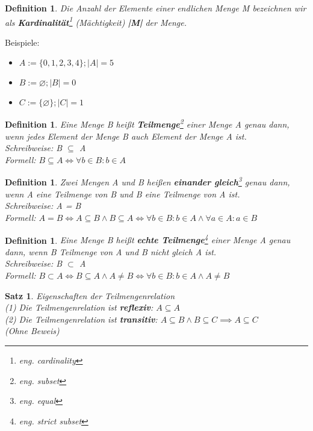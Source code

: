 \documentclass[12pt,german,a4]{article}
\begin{document}
\newtheorem{defCardinality}[defSet]{Definition}
\begin{defCardinality}
Die Anzahl der Elemente einer endlichen Menge M bezeichnen wir als {\bf Kardinalität}\footnote{eng. cardinality} (Mächtigkeit) {\bf|M|} der Menge.
\end{defCardinality}

Beispiele:
\begin{itemize}
\item $A := \{0, 1, 2, 3, 4\}; |A| = 5$
\item $B := \varnothing; |B| = 0$
\item $C := \{\varnothing\}; |C| = 1$
\end{itemize}

\newtheorem{defSubset}[defSet]{Definition}
\begin{defSubset}
Eine Menge B heißt {\bf Teilmenge}\footnote{eng. subset} einer Menge A genau dann, wenn jedes Element der Menge B auch Element der Menge A ist.\\
Schreibweise: B $\subseteq$ A\\
Formell: $B \subseteq A \Leftrightarrow \forall b \in B : b \in A$
\end{defSubset}

\newtheorem{defEqual}[defSet]{Definition}
\begin{defEqual}
Zwei Mengen A und B heißen {\bf einander gleich}\footnote{eng. equal} genau dann, wenn A eine Teilmenge von B und B eine Teilmenge von A ist.\\
Schreibweise: A = B\\
Formell: $A = B \Leftrightarrow A \subseteq B \wedge B \subseteq A \Leftrightarrow \forall b \in B : b \in A \wedge \forall a \in A : a \in B$
\end{defEqual}

\newtheorem{defStrictSubset}[defSet]{Definition}
\begin{defStrictSubset}
Eine Menge B heißt {\bf  echte Teilmenge}\footnote{eng. strict subset} einer Menge A genau dann, wenn B Teilmenge von A und B nicht gleich A ist.\\
Schreibweise: B $\subset$ A\\
Formell: $B \subset A \Leftrightarrow B \subseteq A \wedge A \neq B \Leftrightarrow \forall b \in B : b \in A \wedge A \neq B$
\end{defStrictSubset}

\newtheorem{satz}{Satz}
\begin{satz}
Eigenschaften der Teilmengenrelation\\

(1) Die Teilmengenrelation ist {\bf reflexiv}: $A \subseteq A$\\

(2) Die Teilmengenrelation ist {\bf transitiv}: $A \subseteq B \wedge B \subseteq C \implies A \subseteq C$\\

(Ohne Beweis)
\end{satz}
\end{document}
